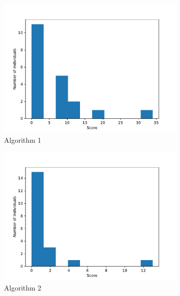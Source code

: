 \documentclass[12pt,a4paper]{article}
\begin{document}
		
		\begin{figure}[h!]
			\begin{subfigure}{.33\textwidth}
				\centering
				\includegraphics[width=\linewidth]{../code/plots/alg1_bests_dist}
				\caption{Algorithm 1}
				\label{fig:alg1_bests_dist}
			\end{subfigure}
			\begin{subfigure}{.33\textwidth}
				\centering
				\includegraphics[width=\linewidth]{../code/plots/alg2_bests_dist}
				\caption{Algorithm 2}
				\label{fig:alg2_bests_dist}
			\end{subfigure}
			\begin{subfigure}{.33\textwidth}
				\centering

\end{subfigure}
\end{figure}
\end{document}
